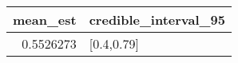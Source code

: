 \begin{longtable}{rl}
\toprule
mean\_est & credible\_interval\_95 \\ 
\midrule
0.5526273 & [0.4,0.79] \\ 
\bottomrule
\end{longtable}

